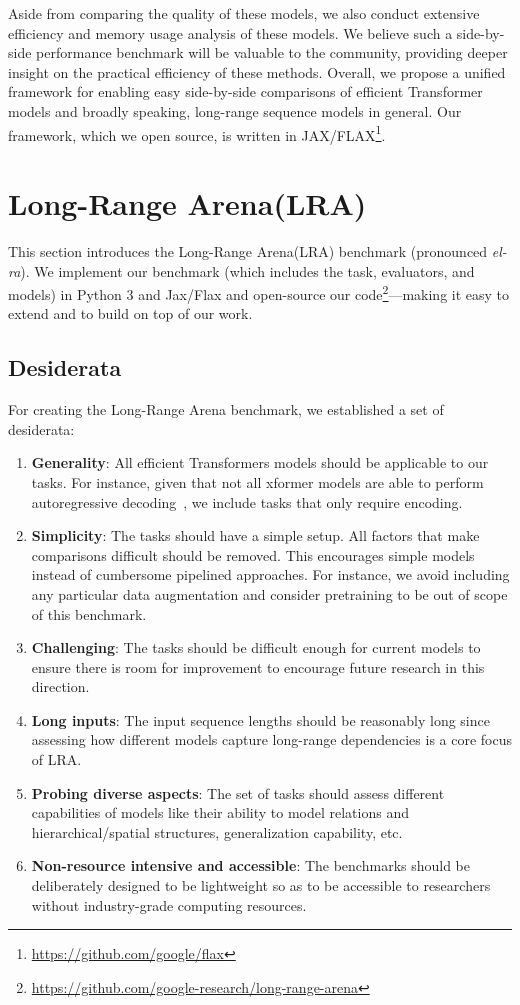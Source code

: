 \documentclass{article} \usepackage{iclr2021_conference,times}
\newcommand{\lra}{Long-Range Arena\xspace}
\begin{document}
Aside from comparing the quality of these models, we also conduct extensive efficiency and memory usage analysis of these models. We believe such a side-by-side performance benchmark will be valuable to the community, providing deeper insight on the practical efficiency of these methods. Overall, we propose a unified framework for enabling easy side-by-side comparisons of efficient Transformer models and broadly speaking, long-range sequence models in general. Our framework, which we open source, is written in JAX/FLAX\footnote{\url{https://github.com/google/flax}}.



\section{\lra (LRA)}
This section introduces the \lra (LRA) benchmark (pronounced \textit{el-ra}). We implement our benchmark (which includes the task, evaluators, and models) in Python 3 and Jax/Flax and open-source our code\footnote{\url{https://github.com/google-research/long-range-arena}}---making it easy to extend and to build on top of our work.


\subsection{Desiderata}
For creating the \lra benchmark, we established a set of desiderata:
\begin{enumerate}[leftmargin=0.6cm]
\item \textbf{Generality}: All efficient Transformers models should be applicable to our tasks. For instance, given that not all xformer models are able to perform autoregressive decoding~\citep{wang2020linformer}, we include tasks that only require encoding. 
\item \textbf{Simplicity}: The tasks should have a simple setup. All factors that make comparisons difficult should be removed. This encourages simple models instead of cumbersome pipelined approaches. For instance, we avoid including any  particular data augmentation and consider pretraining to be out of scope of this benchmark. 
\item \textbf{Challenging}: The tasks should be difficult enough for current models to ensure there is room for improvement to encourage future research in this direction.
\item \textbf{Long inputs}: The input sequence lengths should be reasonably long since assessing how different models capture long-range dependencies is a core focus of LRA.
\item \textbf{Probing diverse aspects}: The set of tasks should assess different capabilities of models like their ability to model relations and hierarchical/spatial structures, generalization capability, etc.
\item \textbf{Non-resource intensive and accessible}: The benchmarks should be deliberately designed to be lightweight so as to be accessible to researchers without industry-grade computing resources.
\end{enumerate}
\end{document}
